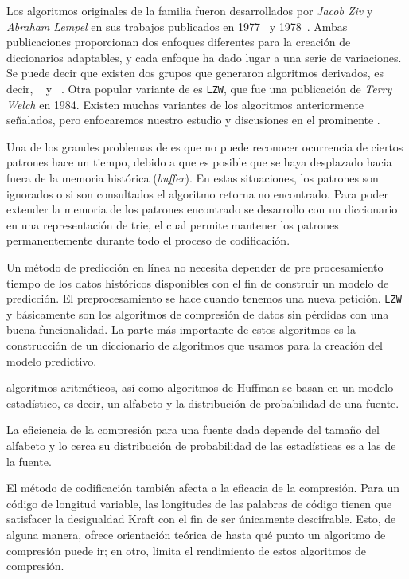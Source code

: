  
Los algoritmos originales de la familia fueron desarrollados por \emph{Jacob Ziv} y \emph{Abraham Lempel} en sus trabajos publicados en 1977~\cite{ZivLempel1977} y 1978~\cite{ZivLempel1978}. Ambas publicaciones proporcionan dos enfoques diferentes para la creación de diccionarios adaptables, y cada enfoque ha dado lugar a una serie de variaciones. Se puede decir que existen dos grupos que generaron algoritmos derivados, es decir, \lzSieteSiete~\cite{ZivLempel1977} y \lzSieteOcho~\cite{ZivLempel1978}. Otra popular variante  de \lzSieteOcho es \texttt{LZW}, que fue una publicación de \emph{Terry Welch} en 1984. Existen muchas variantes de los algoritmos anteriormente señalados,  pero enfocaremos nuestro estudio y discusiones en el prominente \lzSieteOcho. 


Una de los grandes problemas de \lzSieteSiete es que no puede reconocer ocurrencia de ciertos patrones hace un tiempo, debido a que es posible que se haya desplazado hacia fuera de la memoria histórica (\emph{buffer}). En estas situaciones, los patrones son ignorados o si son consultados el algoritmo retorna no encontrado. Para poder extender la memoria de los patrones encontrado se desarrollo \lzSieteOcho con un diccionario en una representación de trie, el cual permite mantener los patrones permanentemente durante todo el proceso de codificación.



Un método de predicción en línea no necesita depender de pre procesamiento tiempo de los datos históricos disponibles con el fin de construir un modelo de predicción. El preprocesamiento se hace cuando tenemos una nueva petición. \texttt{LZW} y \lzSieteOcho básicamente son los algoritmos de compresión de datos sin pérdidas con una buena funcionalidad. La parte más importante de estos algoritmos es la construcción de un diccionario de algoritmos que usamos para la creación del modelo predictivo. 






algoritmos aritméticos, así como algoritmos de Huffman se basan en un modelo estadístico, es decir, un alfabeto y la distribución de probabilidad de una fuente. 

La eficiencia de la compresión para una fuente dada depende del tamaño del alfabeto y lo cerca su distribución de probabilidad de las estadísticas es a las de la fuente. 


El método de codificación también afecta a la eficacia de la compresión. 
Para un código de longitud variable, las longitudes de las palabras de código tienen que satisfacer la desigualdad Kraft con el fin de ser únicamente descifrable. Esto, de alguna manera, ofrece orientación teórica de hasta qué punto un algoritmo de compresión puede ir; en otro, limita el rendimiento de estos algoritmos de compresión.

